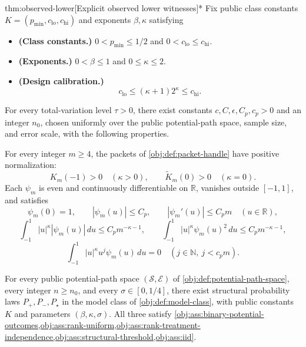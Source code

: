 \begin{theoremv}{thm:observed-lower}[Explicit observed lower witnesses]*
Fix public class constants \(K=(p_{\min},c_{\mathrm{lo}},c_{\mathrm{hi}})\) and exponents \(\beta,\kappa\) satisfying
\begin{itemize}
\item \textbf{(Class constants.)} \(0<p_{\min}\le1/2\) and \(0<c_{\mathrm{lo}}\le c_{\mathrm{hi}}\).
\item \textbf{(Exponents.)} \(0<\beta\le1\) and \(0\le\kappa\le2\).
\item \textbf{(Design calibration.)}
\[
c_{\mathrm{lo}}\le(\kappa+1)2^\kappa\le c_{\mathrm{hi}}.
\]
\end{itemize}
For every total-variation level \(\tau>0\), there exist constants \(c,C,\epsilon,C_p,c_p>0\) and an integer \(n_0\), chosen uniformly over the public potential-path space, sample size, and error scale, with the following properties.

For every integer \(m\ge4\), the packets of \cref{obj:def:packet-handle} have positive normalization:
\[
K_m(-1)>0\quad(\kappa>0),
\qquad
\widetilde K_m(0)>0\quad(\kappa=0).
\]
Each \(\psi_m\) is even and continuously differentiable on \(\mathbb R\), vanishes outside \([-1,1]\), and satisfies
\[
\psi_m(0)=1,\qquad
|\psi_m(u)|\le C_p,\qquad
|\psi_m'(u)|\le C_pm
\quad(u\in\mathbb R),
\]
\[
\int_{-1}^{1}|u|^\kappa|\psi_m(u)|\,du\le C_pm^{-\kappa-1},
\qquad
\int_{-1}^{1}|u|^\kappa\psi_m(u)^2\,du\le C_pm^{-\kappa-1},
\]
\[
\int_{-1}^{1}|u|^\kappa u^j\psi_m(u)\,du=0
\quad(j\in\mathbb N,\ j<c_pm).
\]

For every public potential-path space \((\mathcal S,\mathcal E)\) of \cref{obj:def:potential-path-space}, every integer \(n\ge n_0\), and every \(\sigma\in[0,1/4]\), there exist structural probability laws \(P_+,P_-,P_\star\) in the model class of \cref{obj:def:model-class}, with public constants \(K\) and parameters \((\beta,\kappa,\sigma)\). All three satisfy \cref{obj:ass:binary-potential-outcomes,obj:ass:rank-uniform,obj:ass:rank-treatment-independence,obj:ass:structural-threshold,obj:ass:iid}.


\end{theoremv}
